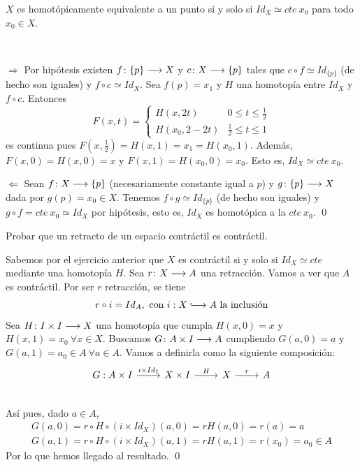 \documentclass[GTS.tex]{subfiles}
\begin{document}
\begin{ejer} $X$ es homotópicamente equivalente a un punto si y solo si $Id_X\simeq cte\ x_0$ para todo $x_0\in X$.
\end{ejer}
\begin{solucion}\ 

$\boxed{\Rightarrow}$ Por hipótesis  existen $f\colon{\{p\}}\longrightarrow{X}$ y $c\colon{X}\longrightarrow{\{p\}}$ tales que $c\circ f\simeq Id_{\{p\}}$ (de hecho son iguales) y $f\circ c\simeq Id_X$. Sea $f(p)=x_1$ y $H$ una homotopía entre $Id_X$ y $f\circ c$. Entonces
\[
F(x,t)=\begin{cases}
H(x,2t) & 0\leq t\leq\frac{1}{2}\\
H(x_0,2-2t) & \frac{1}{2}\leq t\leq 1
\end{cases}
\]
es continua pues $F(x,\frac{1}{2})=H(x,1)=x_1=H(x_0,1)$. Además, $F(x,0)=H(x,0)=x$ y $F(x,1)=H(x_0,0)=x_0$. Esto es, $Id_X\simeq cte\ x_0$.

$\boxed{\Leftarrow}$ Sean $f\colon{X}\longrightarrow{\{p\}}$ (necesariamente constante igual a $p$) y $g\colon{\{p\}}\longrightarrow{X}$ dada por $g(p)= x_0\in X$. Tenemos $f\circ g\simeq Id_{\{p\}}$ (de hecho son iguales) y $g\circ f=cte\ x_0\simeq Id_X$ por hipótesis, esto es, $Id_X$ es homotópica a la $cte\ x_0$. \qed
\end{solucion}

\begin{ejer}
Probar que un retracto de un espacio contráctil es contráctil.
\end{ejer}
\begin{solucion}
Sabemos por el ejercicio anterior que $X$ es contráctil si y solo si $Id_X\simeq cte$ mediante una homotopía $H$. Sea $r\colon{X}\longrightarrow{A}$ una retracción. Vamos a ver que $A$ es contráctil. Por ser $r$ retracción, se tiene
\[
r\circ i =Id_A,\ \text{con }i: X\longhookarrow A\text{ la inclusión}
\]
Sea $H\colon{I\times I}\longrightarrow{X}$ una homotopía que cumpla $H(x,0)=x$ y $H(x,1)=x_0\ \forall x\in X$. Buscamos $G\colon{A\times I}\longrightarrow{A}$ cumpliendo  $G(a,0)=a$ y $G(a,1)=a_0\in A\ \forall a\in A$. Vamos a definirla como la siguiente composición:
\[
\begin{tikzcd}
G: A\times I \arrow[r,"i\times Id_I"]& X\times I \arrow[r, "H"] &  X \arrow[r,"r"] & A \\
\end{tikzcd}
\]
Así pues, dado $a\in A$,
\begin{gather*}
G(a,0)=r\circ H\circ (i\times Id_X)(a,0)=rH(a,0)=r(a)=a\\
G(a,1)=r\circ H\circ (i\times Id_X)(a,1)=rH(a,1)=r(x_0)=a_0\in A
\end{gather*}
Por lo que hemos llegado al resultado. \qed
\end{solucion}
\end{document}
